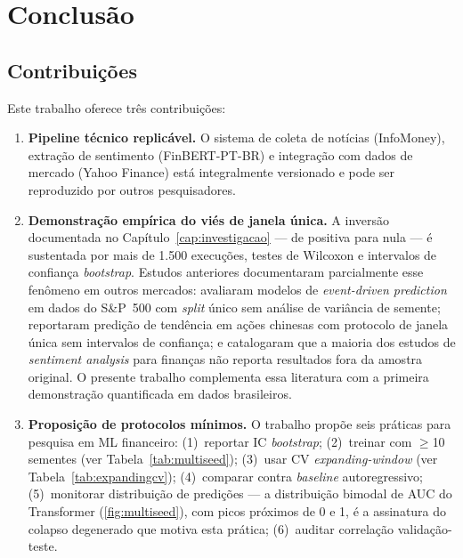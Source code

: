 \chapter{Conclusão}\label{cap:conclusao}

\section{Contribuições}

Este trabalho oferece três contribuições:

\begin{enumerate}
    \item \textbf{Pipeline técnico replicável.} O sistema de coleta de notícias (InfoMoney), extração de sentimento (FinBERT-PT-BR) e integração com dados de mercado (Yahoo Finance) está integralmente versionado e pode ser reproduzido por outros pesquisadores.

    \item \textbf{Demonstração empírica do viés de janela única.} A inversão documentada no Capítulo~\ref{cap:investigacao} --- de positiva para nula --- é sustentada por mais de 1.500 execuções, testes de Wilcoxon e intervalos de confiança \textit{bootstrap}. Estudos anteriores documentaram parcialmente esse fenômeno em outros mercados:  avaliaram modelos de \textit{event-driven prediction} em dados do S\&P~500 com \textit{split} único sem análise de variância de semente;  reportaram predição de tendência em ações chinesas com protocolo de janela única sem intervalos de confiança; e  catalogaram que a maioria dos estudos de \textit{sentiment analysis} para finanças não reporta resultados fora da amostra original. O presente trabalho complementa essa literatura com a primeira demonstração quantificada em dados brasileiros.

    \item \textbf{Proposição de protocolos mínimos.} O trabalho propõe seis práticas para pesquisa em ML financeiro: (1)~reportar IC \textit{bootstrap}; (2)~treinar com $\geq$10 sementes (ver Tabela~\ref{tab:multiseed}); (3)~usar CV \textit{expanding-window} (ver Tabela~\ref{tab:expandingcv}); (4)~comparar contra \textit{baseline} autoregressivo; (5)~monitorar distribuição de predições --- a distribuição bimodal de AUC do Transformer (\autoref{fig:multiseed}), com picos próximos de 0 e 1, é a assinatura do colapso degenerado que motiva esta prática; (6)~auditar correlação validação-teste.
\end{enumerate}

